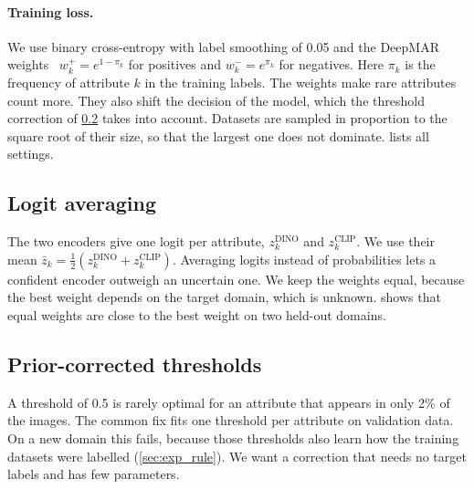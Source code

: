 \documentclass[10pt,twocolumn,letterpaper]{article}
\begin{document}
\paragraph{Training loss.} We use binary cross-entropy with label smoothing of 0.05 and the DeepMAR weights~\cite{deepmar} $w_k^{+}=e^{1-\pi_k}$ for positives and $w_k^{-}=e^{\pi_k}$ for negatives. Here $\pi_k$ is the frequency of attribute $k$ in the training labels. The weights make rare attributes count more. They also shift the decision of the model, which the threshold correction of \cref{sec:rule} takes into account. Datasets are sampled in proportion to the square root of their size, so that the largest one does not dominate.  lists all settings.

\subsection{Logit averaging}
\label{sec:ensemble}

The two encoders give one logit per attribute, $z_k^{\text{DINO}}$ and $z_k^{\text{CLIP}}$. We use their mean $\bar z_k=\frac12(z_k^{\text{DINO}}+z_k^{\text{CLIP}})$. Averaging logits instead of probabilities lets a confident encoder outweigh an uncertain one. We keep the weights equal, because the best weight depends on the target domain, which is unknown.  shows that equal weights are close to the best weight on two held-out domains.

\subsection{Prior-corrected thresholds}
\label{sec:rule}

A threshold of 0.5 is rarely optimal for an attribute that appears in only 2\% of the images. The common fix fits one threshold per attribute on validation data. On a new domain this fails, because those thresholds also learn how the training datasets were labelled (\cref{sec:exp_rule}). We want a correction that needs no target labels and has few parameters.
\end{document}
